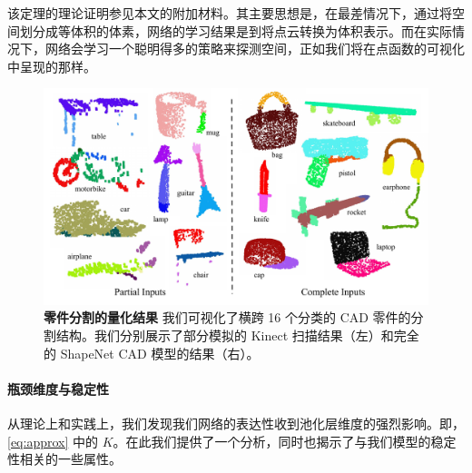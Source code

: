 该定理的理论证明参见本文的附加材料。其主要思想是，在最差情况下，通过将空间划分成等体积的体素，网络的学习结果是到将点云转换为体积表示。而在实际情况下，网络会学习一个聪明得多的策略来探测空间，正如我们将在点函数的可视化中呈现的那样。


\begin{figure}[t!]
    \centering
    \includegraphics[width=0.8\linewidth]{fig/segres.pdf}
    \caption{
        \textbf{零件分割的量化结果} 我们可视化了横跨 16 个分类的 CAD 零件的分割结构。我们分别展示了部分模拟的 Kinect 扫描结果（左）和完全的 ShapeNet CAD 模型的结果（右）。
    }
    \label{fig:qualitative_part_segmentation}
\end{figure}

\paragraph{瓶颈维度与稳定性} 从理论上和实践上，我们发现我们网络的表达性收到池化层维度的强烈影响。即，\eqref{eq:approx} 中的 $K$。在此我们提供了一个分析，同时也揭示了与我们模型的稳定性相关的一些属性。  


